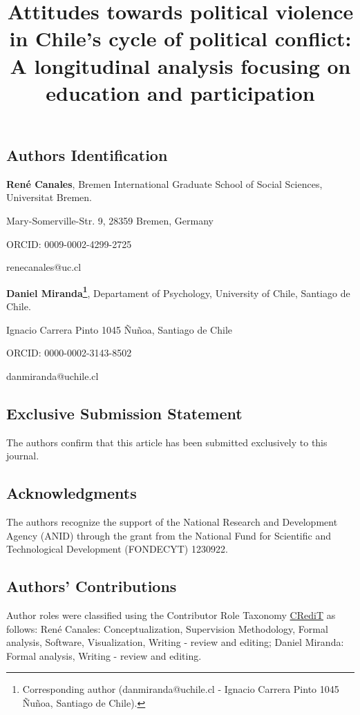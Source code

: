 \documentclass[
  12pt,
  letterpaper,
  DIV=11,
  numbers=noendperiod]{scrartcl}
\title{Attitudes towards political violence in Chile's cycle of
political conflict: A longitudinal analysis focusing on education and
participation}
\author{}
\date{}
\begin{document}
\maketitle


\subsection{Authors Identification}\label{authors-identification}

\textbf{René Canales}, Bremen International Graduate School of Social
Sciences, Universitat Bremen.

Mary-Somerville-Str. 9, 28359 Bremen, Germany

ORCID: 0009-0002-4299-2725

renecanales@uc.cl

\textbf{Daniel Miranda\footnote{Corresponding author
  (danmiranda@uchile.cl - Ignacio Carrera Pinto 1045 Ñuñoa, Santiago de
  Chile).}}, Departament of Psychology, University of Chile, Santiago de
Chile.

Ignacio Carrera Pinto 1045 Ñuñoa, Santiago de Chile

ORCID: 0000-0002-3143-8502

danmiranda@uchile.cl

\subsection{Exclusive Submission
Statement}\label{exclusive-submission-statement}

The authors confirm that this article has been submitted exclusively to
this journal.

\subsection{Acknowledgments}\label{acknowledgments}

The authors recognize the support of the National Research and
Development Agency (ANID) through the grant from the National Fund for
Scientific and Technological Development (FONDECYT) 1230922.

\subsection{Authors' Contributions}\label{authors-contributions}

Author roles were classified using the Contributor Role Taxonomy
\href{https://credit.niso.org/}{CRediT} as follows: René Canales:
Conceptualization, Supervision Methodology, Formal analysis, Software,
Visualization, Writing - review and editing; Daniel Miranda: Formal
analysis, Writing - review and editing.
\end{document}
